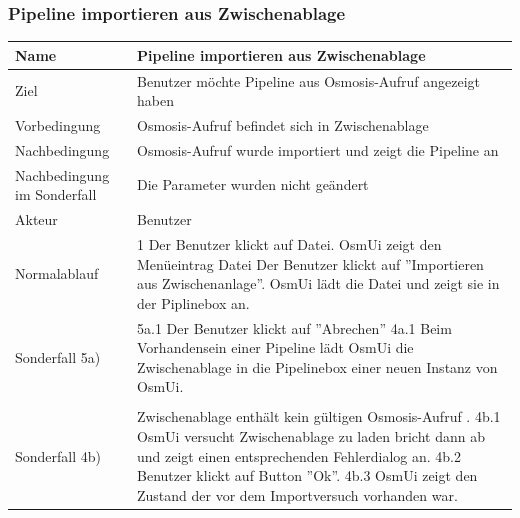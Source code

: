 \documentclass[a4paper,12pt]{scrartcl}
\begin{document}
\subsubsection{Pipeline importieren aus Zwischenablage}
\begin{center}
\begin{tabular}{|p{5cm}|p{10cm}|}
\hline Name & \textbf{Pipeline importieren aus Zwischenablage} \\ 
\hline Ziel & Benutzer möchte Pipeline aus Osmosis-Aufruf angezeigt haben\\ 
\hline Vorbedingung & Osmosis-Aufruf befindet sich in Zwischenablage\\ 
\hline Nachbedingung & Osmosis-Aufruf wurde importiert und zeigt die Pipeline an \\  
\hline Nachbedingung im Sonderfall & Die Parameter wurden nicht geändert\\
\hline Akteur & Benutzer \\ 
\hline Normalablauf & 1 Der Benutzer klickt auf Datei.
\newline 
2 OsmUi zeigt den Menüeintrag Datei
\newline
3 Der Benutzer klickt auf ''Importieren aus Zwischenanlage''.
\newline
4 OsmUi lädt die Datei und zeigt sie in der Piplinebox an.
\\ 
\hline Sonderfall 5a) & 5a.1 Der Benutzer klickt auf ''Abrechen''
\newline
4a.1 Beim Vorhandensein einer Pipeline lädt OsmUi die Zwischenablage in die Pipelinebox einer neuen Instanz von OsmUi.\\\\
\hline Sonderfall 4b)& Zwischenablage enthält kein gültigen Osmosis-Aufruf .
\newline
 4b.1 OsmUi versucht Zwischenablage zu laden bricht dann ab und zeigt einen entsprechenden Fehlerdialog an.
\newline
 4b.2 Benutzer klickt auf Button ''Ok''.
\newline
 4b.3 OsmUi zeigt den Zustand der vor dem Importversuch vorhanden war.
\\
\hline 
\end{tabular} 
\end{center}
\end{document}
